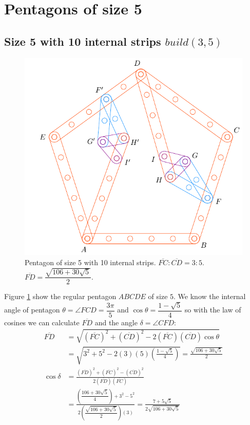 \documentclass[11pt]{article}
\begin{document}

\section{Pentagons of size 5}

\subsection{Size 5 with 10 internal strips $build(3,5)$}

\begin{figure}[h]
\centering
\includegraphics[scale=0.9]{5/penta5-10a}
\caption{Pentagon of size 5 with 10 internal strips. $\overline{FC} : \overline{CD} = 3:5$. $\overline{FD} = \dfrac{\sqrt{106 + 30\sqrt5}}2$.}
\label{fig:penta5-10a}
\end{figure}

Figure \ref{fig:penta5-10a} show the regular pentagon $ABCDE$ of size $5$. We know the internal angle of pentagon $\theta=\angle{FCD} =\dfrac{3\pi}5$ and $\cos\theta=\dfrac{1-\sqrt5}4$ so with the law of cosines we can calculate $\overline{FD}$ and the angle $\delta = \angle{CFD}$:
\begin{align}
\overline{FD} &= \sqrt{(\overline{FC})^2 + (\overline{CD})^2
 - 2(\overline{FC})(\overline{CD})\cos\theta} \nonumber\\
 &= \sqrt{3^2 + 5^2 - 2(3)(5)\left(\frac{1-\sqrt5}4\right)} = \frac{\sqrt{106 + 30\sqrt5}}2\\
%
\cos\delta &= \frac{(\overline{FD})^2 + (\overline{FC})^2 - (\overline{CD})^2}
 {2(\overline{FD})(\overline{FC})} \nonumber\\
 &= \frac{\left(\dfrac{106+30\sqrt5}4\right) + 3^2 - 5^2}
  {2\left(\dfrac{\sqrt{106+30\sqrt5}}2\right)(3)}
  = \frac{7 + 5\sqrt5}{2\sqrt{106 + 30\sqrt5}}
\end{align}
\end{document}
